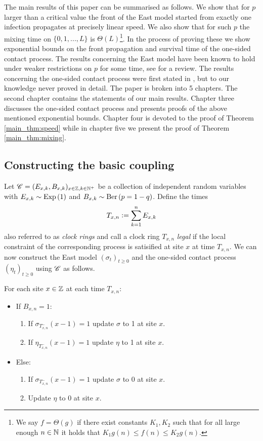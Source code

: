 The main results of this paper can be summarised as follows. We show that for $p$ larger than a critical value the front of the East model started from exactly one infection propagates at precisely linear speed. We also show that for such $p$ the mixing time on $\{ 0, 1, ..., L\}$ is $\Theta(L)$\footnote{We say $f = \Theta(g)$ if there exist constants $K_1, K_2$ such that for all large enough $n \in \mathbb{N}$ it holds that $K_1 g(n) \leq f(n) \leq K_2 g(n)$.}. In the process of proving these we show exponential bounds on the front propagation and survival time of the one-sided contact process. The results concerning the East model have been known to hold under weaker restrictions on $p$ for some time, see \cite{ganguly2015cutoff} for a review. The results concerning the one-sided contact process were first stated in \cite{durrett1983supercritical}, but to our knowledge never proved in detail. The paper is broken into 5 chapters. The second chapter contains the statements of our main results. Chapter three discusses the one-sided contact process and presents proofs of the above mentioned exponential bounds. Chapter four is devoted to the proof of Theorem \ref{main_thm:speed} while in chapter five we present the proof of Theorem \ref{main_thm:mixing}. 


\subsection{Constructing the basic coupling}
Let $\mathscr{C} = (E_{x,k}, B_{x,k})_{x \in \mathbb{Z}, k \in \mathbb{N}^+}$ be a collection of independent random variables with $E_{x,k} \sim \text{Exp} \left( 1 \right)$ and $B_{x,k} \sim \text{Ber} \left( p=1-q \right)$. Define the times 
\[
T_{x,n} \vcentcolon= \sum\limits_{k=1}^n E_{x,k}
\]
 also referred to as \textit{clock rings} and call a clock ring $T_{x,n}$ \textit{legal} if the local constraint of the corresponding process is satisified at site $x$ at time $T_{x,n}$. We can now construct the East model $(\sigma_t)_{t \geq 0}$ and the one-sided contact process $(\eta_t)_{t \geq 0}$ using $\mathscr{C}$ as follows. 
 
For each site $x \in \mathbb{Z}$ at each time $T_{x,n}$:
\begin{itemize}
  \item If $B_{x,n} = 1$:
  \begin{enumerate}
  	\item If $\sigma_{T^-_{x,n}} (x-1) = 1$ update $\sigma$ to 1 at site $x$. 
  	\item If $\eta_{T^-_{x,n}} (x-1) = 1$ update $\eta$ to 1 at site $x$. 
  \end{enumerate}
  \item Else:
  \begin{enumerate}
  	\item If $\sigma_{T^-_{x,n}} (x-1) = 1$ update $\sigma$ to 0 at site $x$. 
  	\item Update $\eta$ to 0 at site $x$. 
  \end{enumerate}
\end{itemize}

